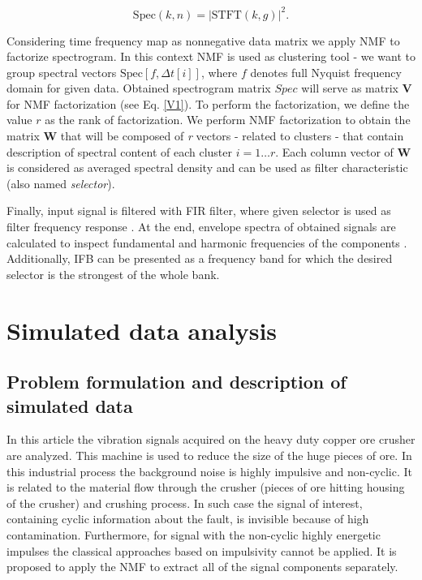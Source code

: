 \documentclass[preprint,12pt]{elsarticle}
\begin{document}
\begin{equation}
\textrm{Spec}(k,n)=|\textrm{STFT}(k,g)|^2.
\end{equation}




Considering time frequency map as nonnegative data matrix we apply NMF to factorize spectrogram. In this context NMF is used as clustering tool - we want to group spectral vectors  $\textrm{Spec}[f,\Delta t[i]]$, where $f$ denotes full Nyquist frequency domain for given data. Obtained spectrogram matrix $Spec$ will serve as matrix $\mathbf{V}$ for NMF factorization (see Eq. \ref{V1}). To perform the factorization, we define the value $r$ as the rank of factorization. We perform NMF factorization to obtain the matrix \textbf{W} that will be composed of \textit{r} vectors - related to clusters - that contain description of spectral content of each cluster $i=1 \dots r$. Each column vector of \textbf{W} is considered as averaged spectral density and can be used as filter characteristic (also named \emph{selector}).

Finally, input signal is filtered with FIR filter, where given selector is used as filter frequency response \cite{alan1989discrete}. At the end, envelope spectra of obtained signals are calculated to inspect fundamental and harmonic frequencies of the components \cite{randall2011rolling}. Additionally, IFB can be presented as a frequency band for which the desired selector is the strongest of the whole bank.

\section{Simulated data analysis}
\label{sec:sim data}
\subsection{Problem formulation and description of simulated data}
In this article the vibration signals acquired on the heavy duty copper ore crusher are analyzed. This machine is used to reduce the size of the huge pieces of ore. In this industrial process the background noise is highly impulsive and non-cyclic. It is related to the material flow through the crusher (pieces of ore hitting housing of the crusher) and crushing process. In such case the signal of interest, containing cyclic information about the fault, is invisible  because of high contamination. Furthermore, for signal with the non-cyclic highly energetic impulses the classical approaches based on impulsivity cannot be applied. It is proposed to apply the NMF to extract all of the signal components separately. 
\end{document}
